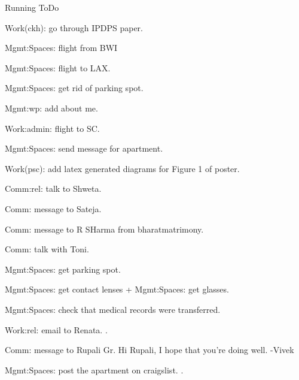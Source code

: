 \begin{columns}
\begin{column}{0.6\linewidth}
\begin{block}{Running ToDo}
    \item \tiny Work(ckh): go through IPDPS paper. 

    \item \tiny Mgmt:Spaces: flight from BWI
    \item \tiny Mgmt:Spaces: flight to LAX. 

    \item \tiny Mgmt:Spaces: get rid of parking spot. 

    \item \tiny Mgmt:wp: add about me. 

    \item \tiny Work:admin: flight to SC. 
    \item \tiny Mgmt:Spaces: send message for apartment. 
      
    \item \tiny Work(psc): add latex generated diagrams for Figure 1
      of poster. 


    \item \tiny Comm:rel: talk to Shweta. 
    \item \tiny Comm: message to Sateja. 
    \item \tiny Comm: message to R SHarma from bharatmatrimony. 
    \item \tiny Comm: talk with Toni. 

    \item \tiny Mgmt:Spaces: get parking spot. 
    \item \tiny Mgmt:Spaces: get contact lenses + Mgmt:Spaces: get glasses.
    \item \tiny Mgmt:Spaces: check that medical records were transferred. 

    \item \tiny Work:rel: email to Renata. . 
      
    \item \tiny Comm: message to Rupali Gr. 
      Hi Rupali, I hope that you're doing well. -Vivek

    \item \tiny Mgmt:Spaces: post the apartment on craigslist. 
      . 


\end{block}
\end{column}
\end{columns}
